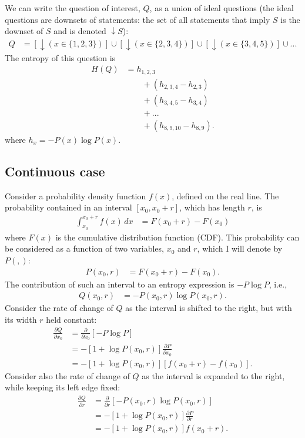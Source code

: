\documentclass[entropy,article,accept,oneauthor,pdftex,10pt,a4paper]{mdpi}
\begin{document}
We can write the question of interest, $Q$, as a union of ideal questions
(the ideal questions are downsets of statements: the set of all statements
that imply $S$ is the downset of $S$ and is denoted $\downarrow S$):
\begin{align}
Q &= \left[\downarrow (x \in \{1, 2, 3\})\right] \cup
     \left[\downarrow (x \in \{2, 3, 4\})\right] \cup
     \left[\downarrow (x \in \{3, 4, 5\})\right] \cup ...
\end{align}
The entropy of this question is
\begin{align}
H(Q) &= h_{1,2,3}\\
     & \quad \quad + \left(h_{2,3,4} - h_{2,3}\right) \\
     & \quad \quad + \left(h_{3,4,5} - h_{3,4}\right) \\
     & \quad \quad + ... \\
     & \quad \quad + \left(h_{8,9,10} - h_{8,9}\right).
\end{align}
where $h_{x} = -P(x)\log P(x)$.

\subsection*{Continuous case}

Consider a probability density function $f(x)$, defined on the real
line. The probability contained in an interval
$[x_0, x_0 + r]$, which has length $r$, is
\begin{align}
\int_{x_0}^{x_0 + r} f(x) \, dx &= F(x_0 + r) - F(x_0)
\end{align}
where $F(x)$ is the cumulative distribution function (CDF).
This probability can be considered as a function of two variables,
$x_0$ and $r$, which I will denote by $P(,)$:
\begin{align}
P(x_0, r) &= F(x_0 + r) - F(x_0).
\end{align}
The contribution of such an interval to an entropy expression
is $-P\log P$, i.e.,
\begin{align}
Q(x_0, r) &= -P(x_0, r) \log P(x_0, r).
\end{align}
Consider the rate of change of $Q$ as the interval is shifted to
the right, but with its width $r$ held constant:
\begin{align}
\frac{\partial Q}{\partial x_0} &= \frac{\partial}{\partial x_0}
    \left[-P\log P\right] \\
    &= -\left[1 + \log P(x_0, r)\right]\frac{\partial P}{\partial x_0} \\
    &= -\left[1 + \log P(x_0, r)\right]\left[f(x_0 + r) - f(x_0)\right].
\end{align}
Consider also the rate of change of $Q$ as the interval is
expanded to the right, while keeping its left edge fixed:
\begin{align}
\frac{\partial Q}{\partial r} &= \frac{\partial}{\partial r}
    \left[-P(x_0, r) \log P(x_0, r)\right] \\
    &= -\left[1 + \log P(x_0, r)\right]\frac{\partial P}{\partial r} \\
    &= -\left[1 + \log P(x_0, r)\right]f(x_0 + r).
\end{align}
\end{document}
